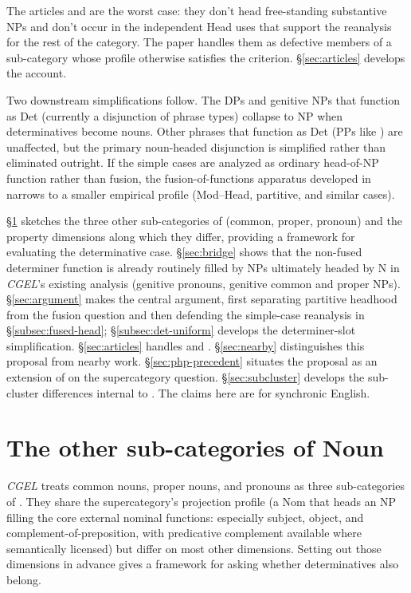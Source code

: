 \documentclass[12pt]{article}
\begin{document}
The articles  and  are the worst case: they don't head free-standing substantive NPs and don't occur in the independent Head uses that support the reanalysis for the rest of the category. The paper handles them as defective members of a sub-category whose profile otherwise satisfies the criterion. §\ref{sec:articles} develops the account.

Two downstream simplifications follow. The DPs and genitive NPs that function as Det (currently a disjunction of phrase types) collapse to NP when determinatives become nouns. Other phrases that function as Det (PPs like ) are unaffected, but the primary noun-headed disjunction is simplified rather than eliminated outright. If the simple cases are analyzed as ordinary head-of-NP function rather than fusion, the fusion-of-functions apparatus developed in \textcite{Payne2007} narrows to a smaller empirical profile (Mod--Head, partitive, and similar cases).

§\ref{sec:existing} sketches the three other sub-categories of  (common, proper, pronoun) and the property dimensions along which they differ, providing a framework for evaluating the determinative case. §\ref{sec:bridge} shows that the non-fused determiner function is already routinely filled by NPs ultimately headed by N in \textit{CGEL}'s existing analysis (genitive pronouns, genitive common and proper NPs). §\ref{sec:argument} makes the central argument, first separating partitive headhood from the fusion question and then defending the simple-case reanalysis in §\ref{subsec:fused-head}; §\ref{subsec:det-uniform} develops the determiner-slot simplification. §\ref{sec:articles} handles  and . §\ref{sec:nearby} distinguishes this proposal from nearby work. §\ref{sec:php-precedent} situates the proposal as an extension of \textcite{payne2010} on the supercategory question. §\ref{sec:subcluster} develops the sub-cluster differences internal to . The claims here are for synchronic English.

\section{The other sub-categories of Noun}\label{sec:existing}

\textit{CGEL} treats common nouns, proper nouns, and pronouns as three sub-categories of . They share the supercategory's projection profile (a Nom that heads an NP filling the core external nominal functions: especially subject, object, and complement-of-preposition, with predicative complement available where semantically licensed) but differ on most other dimensions. Setting out those dimensions in advance gives a framework for asking whether determinatives also belong.
\end{document}

